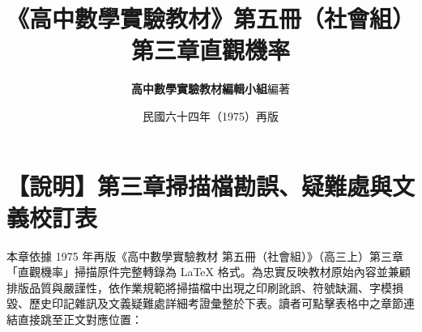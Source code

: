 \documentclass[a4paper,12pt,twoside]{article}
\title{\LARGE\textbf{《高中數學實驗教材》第五冊（社會組）}\\[0.5em] \Large\textbf{第三章\quad 直觀機率}}
\author{\textbf{高中數學實驗教材編輯小組}\quad 編著}
\date{民國六十四年（1975）再版}
\begin{document}
\maketitle
\thispagestyle{firstpage}

\section*{【說明】第三章掃描檔勘誤、疑難處與文義校訂表}
\label{sec:errata_notes_b5_ch3}
\label{sec:current_errata}

本章依據 1975 年再版《高中數學實驗教材 第五冊（社會組）》（高三上）第三章「直觀機率」掃描原件完整轉錄為 \LaTeX{} 格式。為忠實反映教材原始內容並兼顧排版品質與嚴謹性，依作業規範將掃描檔中出現之印刷訛誤、符號缺漏、字模損毀、歷史印記雜訊及文義疑難處詳細考證彙整於下表。讀者可點擊表格中之章節連結直接跳至正文對應位置：
\end{document}
